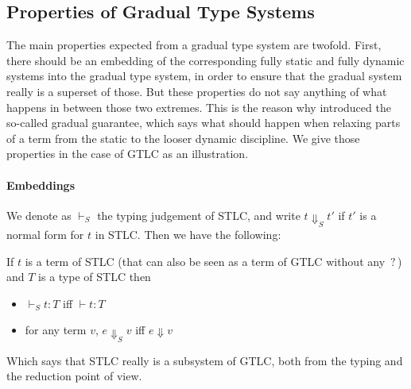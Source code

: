 \documentclass{kaobook}
\newcommand{\red}{\mapsto}
\newcommand{\comp}{\rightsquigarrow}
\DeclareMathOperator{\?}{?}
\begin{document}
{%

\subsection{Properties of Gradual Type Systems}
\label{props}

The main properties expected from a gradual type system are twofold. First, there should be an embedding of the corresponding fully static and fully dynamic systems into the gradual type system, in order to ensure that the gradual system really is a superset of those. But these properties do not say anything of what happens in between those two extremes. This is the reason why \cite{Siek2015} introduced the so-called gradual guarantee, which says what should happen when relaxing parts of a term from the static to the looser dynamic discipline.
We give those properties in the case of GTLC as an illustration.

\paragraph{Embeddings}

We denote as $\vdash_S$ the typing judgement of STLC, and write $t \Downarrow_S t'$ if $t'$ is a normal form for $t$ in STLC. Then we have the following:

\begin{prop}
	If $t$ is a term of STLC (that can also be seen as a term of GTLC without any $\?$) and $T$ is a type of STLC then
	\begin{itemize}
		\item $ \vdash_S t : T$ iff $\vdash t : T$
		\item for any term $v$, $e \Downarrow_S v$ iff $e \Downarrow v$
	\end{itemize}
\end{prop}

Which says that STLC really is a subsystem of GTLC, both from the typing and the reduction point of view.

}
\end{document}

